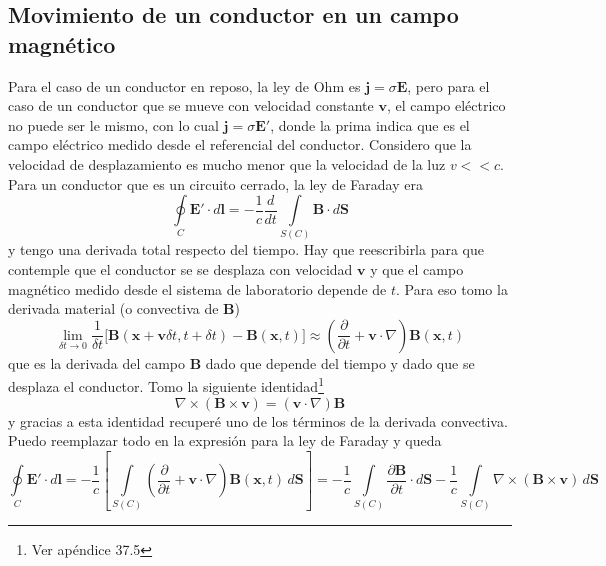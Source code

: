 \subsection{Movimiento de un conductor en un campo magnético}
Para el caso de un conductor en reposo, la ley de Ohm es $\textbf{j} = \sigma \textbf{E}$, pero para el caso de un conductor que se mueve con velocidad constante $\textbf{v}$, el campo eléctrico no puede ser le mismo, con lo cual $\textbf{j} = \sigma \textbf{E}'$, donde la prima indica que es el campo eléctrico medido desde el referencial del conductor. Considero que la velocidad de desplazamiento es mucho menor que la velocidad de la luz $v << c$. Para un conductor que es un circuito cerrado, la ley de Faraday era
\begin{equation*}
    \oint\limits_{C}\textbf{E}'\cdot d\textbf{l} 
    = -\frac{1}{c}\frac{d}{dt}\int\limits_{S(C)}\textbf{B}\cdot d\textbf{S}
\end{equation*}
y tengo una derivada total respecto del tiempo. Hay que reescribirla para que contemple que el conductor se se desplaza con velocidad $\textbf{v}$ y que el campo magnético medido desde el sistema de laboratorio depende de $t$. Para eso tomo la derivada material (o convectiva de $\textbf{B}$)
\begin{equation*}
    \lim_{\delta t\to 0} \frac{1}{\delta t}
    \bigg[
        \textbf{B}(\textbf{x} + \textbf{v}\delta t, t + \delta t ) - \textbf{B}(\textbf{x}, t)
    \bigg]
    \approx
    \left(
        \frac{\partial}{\partial t} + \textbf{v}\cdot \nabla 
    \right)\textbf{B}(\textbf{x},t)
\end{equation*}
que es la derivada del campo $\textbf{B}$ dado que depende del tiempo y dado que se desplaza el conductor. Tomo la siguiente identidad\footnote{Ver apéndice 37.5}
\begin{equation*}
    \nabla \times (\textbf{B} \times \textbf{v})
    = 
    \left(
        \textbf{v} \cdot \nabla
    \right)\textbf{B}
\end{equation*}
y gracias a esta identidad recuperé uno de los términos de la derivada convectiva. Puedo reemplazar todo en la expresión para la ley de Faraday y queda
\begin{equation*}
    \oint\limits_{C} \textbf{E}'\cdot d\textbf{l} = 
    -\frac{1}{c}
    \left[
        \int\limits_{S(C)}
        \left(
            \frac{\partial}{\partial t} + \textbf{v}\cdot \nabla
        \right)\textbf{B}(\textbf{x},t)\,d\textbf{S}
    \right]
    =
    -\frac{1}{c}
    \int\limits_{S(C)}
    \frac{\partial \textbf{B}}{\partial t}\cdot d\textbf{S} 
    -
    \frac{1}{c}
    \int\limits_{S(C)}
    \nabla \times (\textbf{B}\times \textbf{v})\,d\textbf{S}
\end{equation*}
